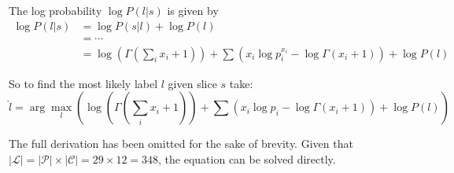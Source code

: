 \documentclass[12pt,a4paper,twoside,openright]{report} \usepackage[pdfborder={0 0 0}]{hyperref}    %
\theoremstyle{definition} \newtheorem{definition}{Definition}[section]
\begin{document}
The log probability $\log P(l|s)$ is given by \begin{equation} \begin{aligned} \log P(l|s) &= \log P(s|l) + \log P(l) \\
&= \cdots \\ &= \log \left(\Gamma\left(\sum\limits_{i} x_i + 1\right) \right) +  \sum\limits \left( x_i \log p_i^{x_i}
- \log \Gamma (x_i + 1) \right) +  \log P(l) \end{aligned} \label{eq:loglabelgivenchordtones} \end{equation}

So to find the most likely label $l$ given slice $s$ take: \begin{equation} \hat{l} = \arg\max_l \left(\log
\left(\Gamma\left(\sum\limits_{i} x_i + 1\right) \right) +  \sum\limits \left( x_i \log p_i - \log \Gamma (x_i + 1)
\right) +  \log P(l) \right) \label{eq:loglabsol} \end{equation}

The full derivation has been omitted for the sake of brevity. Given that $|\mathcal{L}| = |\mathcal{P}| \times
|\mathcal{C}| = 29 \times 12 = 348$, the equation can be solved directly. 

\end{document}
